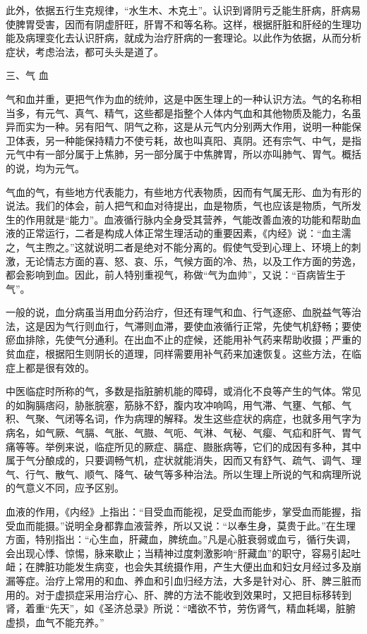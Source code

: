 \documentclass[a4paper,12pt,UTF8,twoside]{ctexbook}
\begin{document}
此外，依据五行生克规律，“水生木、木克土”。认识到肾阴亏乏能生肝病，肝病易使脾胃受害，因而有阴虚肝旺，肝胃不和等名称。这样，根据肝脏和肝经的生理功能及病理变化去认识肝病，就成为治疗肝病的一套理论。以此作为依据，从而分析症状，考虑治法，都可头头是道了。

三、气 血

气和血并重，更把气作为血的统帅，这是中医生理上的一种认识方法。气的名称相当多，有元气、真气、精气，这些都是指整个人体内气血和其他物质及能力，名虽异而实为一种。另有阳气、阴气之称，这是从元气内分别两大作用，说明一种能保卫体表，另一种能保持精力不使亏耗，故也叫真阳、真阴。还有宗气、中气，是指元气中有一部分属于上焦肺，另一部分属于中焦脾胃，所以亦叫肺气、胃气。概括的说，均为元气。

气血的气，有些地方代表能力，有些地方代表物质，因而有气属无形、血为有形的说法。我们的体会，前人把气和血对待提出，血是物质，气也应该是物质，气所发生的作用就是“能力”。血液循行脉内全身受其营养，气能改善血液的功能和帮助血液的正常运行，二者是构成人体正常生理活动的重要因素，《内经》说：“血主濡之，气主煦之。”这就说明二者是绝对不能分离的。假使气受到心理上、环境上的刺激，无论情志方面的喜、怒、哀、乐，气候方面的冷、热，以及工作方面的劳逸，都会影响到血。因此，前人特别重视气，称做“气为血帅”，又说：“百病皆生于气”。

一般的说，血分病虽当用血分药治疗，但还有理气和血、行气逐瘀、血脱益气等治法，这是因为气行则血行，气滞则血滞，要使血液循行正常，先使气机舒畅；要使瘀血排除，先使气分通利。在出血不止的症候，还能用补气药来帮助收摄；严重的贫血症，根据阳生则阴长的道理，同样需要用补气药来加速恢复。这些方法，在临症上都是很有效的。

中医临症时所称的气，多数是指脏腑机能的障碍，或消化不良等产生的气体。常见的如胸膈痞闷，胁胀脘塞，筋脉不舒，腹内攻冲响鸣，用气滞、气壅、气郁、气积、气聚、气闭等名词，作为病理的解释。发生这些症状的病症，也就多用气字为病名，如气厥、气膈、气胀、气臌、气呃、气淋、气秘、气瘿、气疝和肝气、胃气痛等等。举例来说，临症所见的厥症、膈症、臌胀病等，它们的成因有多种，其中属于气分酿成的，只要调畅气机，症状就能消失，因而又有舒气、疏气、调气、理气、行气、散气、顺气、降气、破气等多种治法。所以生理上所说的气和病理所说的气意义不同，应予区别。

血液的作用，《内经》上指出：“目受血而能视，足受血而能步，掌受血而能握，指受血而能摄。”说明全身都靠血液营养，所以又说：“以奉生身，莫贵于此。”在生理方面，特别指出：“心生血，肝藏血，脾统血。”凡是心脏衰弱或血亏，循行失调，会出现心悸、惊惕，脉来歇止；当精神过度刺激影响“肝藏血”的职守，容易引起吐衄；在脾脏功能发生病变，也会失其统摄作用，产生大便出血和妇女月经过多及崩漏等症。治疗上常用的和血、养血和引血归经方法，大多是针对心、肝、脾三脏而用的。对于虚损症采用治疗心、肝、脾的方法不能收到效果时，又把目标移转到肾，着重“先天”，如《圣济总录》所说：“嗜欲不节，劳伤肾气，精血耗竭，脏腑虚损，血气不能充养。”
\end{document}
